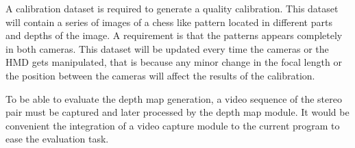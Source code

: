 \documentclass[10pt,a4paper,twocolumn,twoside]{article}
\begin{document}
	A calibration dataset is required to generate a quality calibration. This dataset will contain a series of images of a chess like pattern located in different parts and depths of the image. A requirement is that the patterns appears completely in both cameras. This dataset will be updated every time the cameras or the HMD gets manipulated, that is because any minor change in the focal length or the position between the cameras will affect the results of the calibration.
	
	To be able to evaluate the depth map generation, a video sequence of the stereo pair must be captured and later processed by the depth map module. It would be convenient the integration of a video capture module to the current program to ease the evaluation task.
	
	
\end{document}
